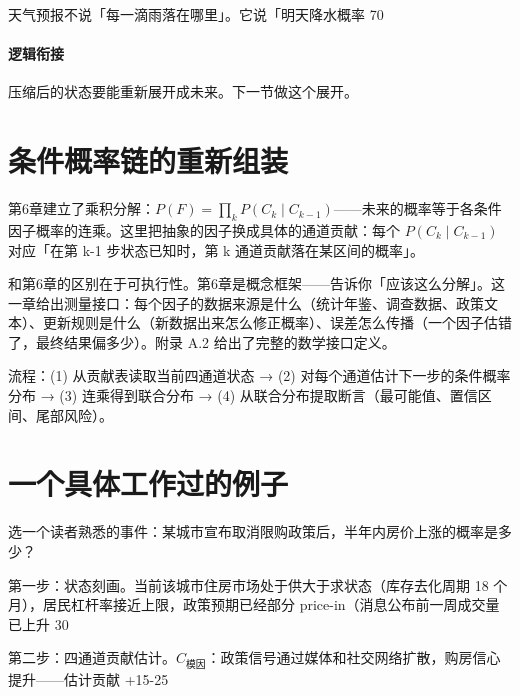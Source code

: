 \documentclass[../../main2.tex]{subfiles}
\begin{document}
	\begin{readingnote}
		天气预报不说「每一滴雨落在哪里」。它说「明天降水概率 70%
	\end{readingnote}

	\paragraph*{逻辑衔接}
	压缩后的状态要能重新展开成未来。下一节做这个展开。
	\section{条件概率链的重新组装}
	第6章建立了乘积分解：$P(F) = \prod_k P(C_k \mid C_{k-1})$——未来的概率等于各条件因子概率的连乘。这里把抽象的因子换成具体的通道贡献：每个 $P(C_k \mid C_{k-1})$ 对应「在第 k-1 步状态已知时，第 k 通道贡献落在某区间的概率」。

	和第6章的区别在于可执行性。第6章是概念框架——告诉你「应该这么分解」。这一章给出测量接口：每个因子的数据来源是什么（统计年鉴、调查数据、政策文本）、更新规则是什么（新数据出来怎么修正概率）、误差怎么传播（一个因子估错了，最终结果偏多少）。附录 A.2 给出了完整的数学接口定义。

	流程：(1) 从贡献表读取当前四通道状态 → (2) 对每个通道估计下一步的条件概率分布 → (3) 连乘得到联合分布 → (4) 从联合分布提取断言（最可能值、置信区间、尾部风险）。
	\section{一个具体工作过的例子}
	\label{sec:fc-example}
	选一个读者熟悉的事件：某城市宣布取消限购政策后，半年内房价上涨的概率是多少？

	第一步：状态刻画。当前该城市住房市场处于供大于求状态（库存去化周期 18 个月），居民杠杆率接近上限，政策预期已经部分 price-in（消息公布前一周成交量已上升 30%

	第二步：四通道贡献估计。$C_{\text{模因}}$：政策信号通过媒体和社交网络扩散，购房信心提升——估计贡献 +15-25%
\end{document}
